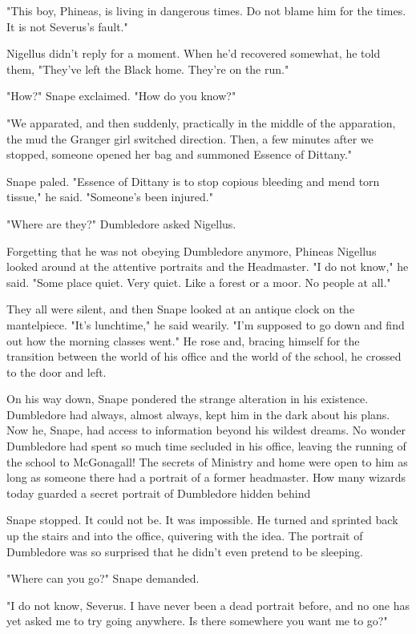 "This boy, Phineas, is living in dangerous times. Do not blame him for the times. It is not Severus's fault."

Nigellus didn't reply for a moment. When he'd recovered somewhat, he told them, "They've left the Black home. They're on the run."

"How?" Snape exclaimed. "How do you know?"

"We apparated, and then suddenly, practically in the middle of the apparation, the mud{\el} the Granger girl switched direction. Then, a few minutes after we stopped, someone opened her bag and summoned Essence of Dittany."

Snape paled. "Essence of Dittany is to stop copious bleeding and mend torn tissue," he said. "Someone's been injured."

"Where are they?" Dumbledore asked Nigellus.

Forgetting that he was not obeying Dumbledore anymore, Phineas Nigellus looked around at the attentive portraits and the Headmaster. "I do not know," he said. "Some place quiet. Very quiet. Like a forest or a moor. No people at all."

They all were silent, and then Snape looked at an antique clock on the mantelpiece. "It's lunchtime," he said wearily. "I'm supposed to go down and find out how the morning classes went." He rose and, bracing himself for the transition between the world of his office and the world of the school, he crossed to the door and left.

On his way down, Snape pondered the strange alteration in his existence. Dumbledore had always, almost always, kept him in the dark about his plans. Now he, Snape, had access to information beyond his wildest dreams. No wonder Dumbledore had spent so much time secluded in his office, leaving the running of the school to McGonagall! The secrets of Ministry and home were open to him as long as someone there had a portrait of a former headmaster. How many wizards today guarded a secret portrait of Dumbledore hidden behind{\el}

Snape stopped. It could not be. It was impossible. He turned and sprinted back up the stairs and into the office, quivering with the idea. The portrait of Dumbledore was so surprised that he didn't even pretend to be sleeping.

"Where can you go?" Snape demanded.

"I do not know, Severus. I have never been a dead portrait before, and no one has yet asked me to try going anywhere. Is there somewhere you want me to go?"

